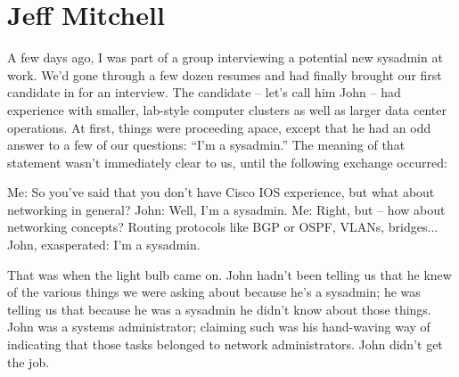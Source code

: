 \chapter{Jeff Mitchell}
A few days ago, I was part of a group interviewing a potential new sysadmin at work. We’d gone through a few dozen resumes and had finally brought our first candidate in for an interview. The candidate -- let’s call him John -- had experience with smaller, lab-style computer clusters as well as larger data center operations. At first, things were proceeding apace, except that he had an odd answer to a few of our questions: “I’m a sysadmin.”
The meaning of that statement wasn’t immediately clear to us, until the following exchange occurred:

Me: So you’ve said that you don’t have Cisco IOS experience, but what about networking in general?
John: Well, I’m a sysadmin.
Me: Right, but -- how about networking concepts? Routing protocols like BGP or OSPF, VLANs, bridges...
John, exasperated: I’m a sysadmin.

That was when the light bulb came on. John hadn’t been telling us that he knew of the various things we were asking about because he’s a sysadmin; he was telling us that because he was a sysadmin he didn’t know about those things. John was a systems administrator; claiming such was his hand-waving way of indicating that those tasks belonged to network administrators.
John didn’t get the job.

